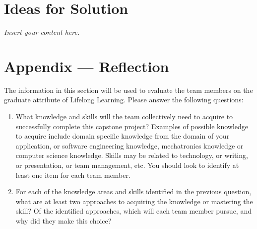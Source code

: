\documentclass[12pt]{article}
\newcommand{\lips}{\textit{Insert your content here.}}
\begin{document}
\section{Ideas for Solution}
\lips

\newpage{}
\section*{Appendix --- Reflection}

The information in this section will be used to evaluate the team members on the
graduate attribute of Lifelong Learning.  Please answer the following questions:

\begin{enumerate}
  \item What knowledge and skills will the team collectively need to acquire to
  successfully complete this capstone project?  Examples of possible knowledge
  to acquire include domain specific knowledge from the domain of your
  application, or software engineering knowledge, mechatronics knowledge or
  computer science knowledge.  Skills may be related to technology, or writing,
  or presentation, or team management, etc.  You should look to identify at
  least one item for each team member.
  \item For each of the knowledge areas and skills identified in the previous
  question, what are at least two approaches to acquiring the knowledge or
  mastering the skill?  Of the identified approaches, which will each team
  member pursue, and why did they make this choice?
\end{enumerate}
\end{document}
